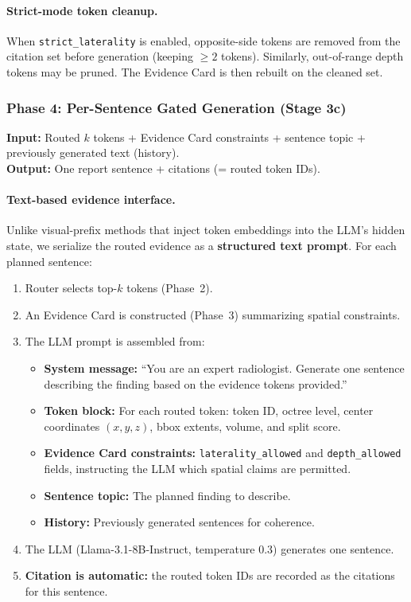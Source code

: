 \documentclass[11pt,a4paper]{article}
\begin{document}
\paragraph{Strict-mode token cleanup.}
When \texttt{strict\_laterality} is enabled, opposite-side tokens are removed from the citation set before generation (keeping $\ge 2$ tokens). Similarly, out-of-range depth tokens may be pruned. The Evidence Card is then rebuilt on the cleaned set.

\subsubsection{Phase 4: Per-Sentence Gated Generation (Stage 3c)}
\label{sec:per_sent_gen}

\begin{iobox}
\textcolor{inputcolor}{\textbf{Input:}} Routed $k$ tokens + Evidence Card constraints + sentence topic + previously generated text (history).\\
\textcolor{outputcolor}{\textbf{Output:}} One report sentence + citations (= routed token IDs).
\end{iobox}

\paragraph{Text-based evidence interface.}
Unlike visual-prefix methods that inject token embeddings into the LLM's hidden state, we serialize the routed evidence as a \textbf{structured text prompt}.
For each planned sentence:
\begin{enumerate}[nosep]
    \item Router selects top-$k$ tokens (Phase~2).
    \item An Evidence Card is constructed (Phase~3) summarizing spatial constraints.
    \item The LLM prompt is assembled from:
    \begin{itemize}[nosep]
        \item \textbf{System message:} ``You are an expert radiologist. Generate one sentence describing the finding based on the evidence tokens provided.''
        \item \textbf{Token block:} For each routed token: token ID, octree level, center coordinates $(x,y,z)$, bbox extents, volume, and split score.
        \item \textbf{Evidence Card constraints:} \texttt{laterality\_allowed} and \texttt{depth\_allowed} fields, instructing the LLM which spatial claims are permitted.
        \item \textbf{Sentence topic:} The planned finding to describe.
        \item \textbf{History:} Previously generated sentences for coherence.
    \end{itemize}
    \item The LLM (Llama-3.1-8B-Instruct, temperature 0.3) generates one sentence.
    \item \textbf{Citation is automatic:} the routed token IDs are recorded as the citations for this sentence.
\end{enumerate}
\end{document}
